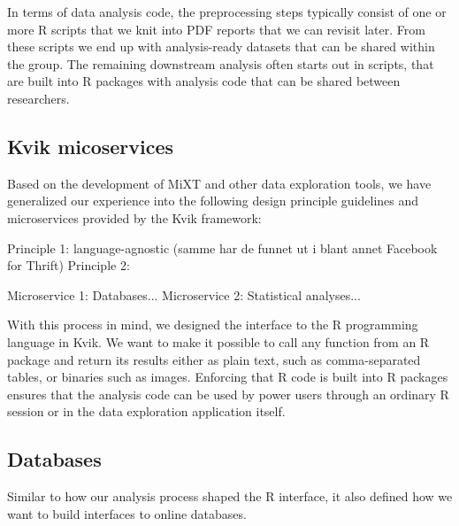 
In terms of data analysis code, the preprocessing steps typically consist of
one or more R scripts that we knit \cite{knitr} into PDF reports that we can
revisit later. From these scripts we end up with analysis-ready datasets that
can be shared within the group. The remaining downstream analysis often starts
out in scripts, that are built into R packages with analysis code that can be
shared between researchers. 

\subsection{Kvik micoservices}

Based on the development of MiXT and other data exploration tools, we have
generalized our experience into the following design principle guidelines and
microservices provided by the Kvik framework:

Principle 1: language-agnostic (samme har de funnet ut i blant annet Facebook for Thrift)
Principle 2:

Microservice 1: Databases...
Microservice 2: Statistical analyses...


With this process in mind, we designed the interface to the R programming
language in Kvik. We want to make it possible to call any function from an R
package and return its results either as plain text, such as comma-separated
tables, or binaries such as images. Enforcing that R code is built into R
packages ensures that the analysis code can be used by power users through an
ordinary R session or in the data exploration application itself. 

\subsection*{Databases} 

Similar to how our analysis process shaped the R interface, it also defined how
we want to build interfaces to online databases. 

